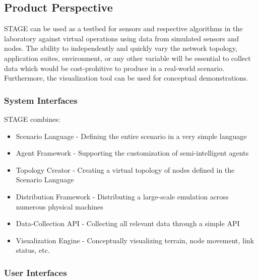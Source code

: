 \documentclass[titlepage]{article}
\begin{document}

\subsection{Product Perspective%
  \label{product-perspective}%
}

STAGE can be used as a testbed for sensors and respective algorithms in the laboratory against virtual operations using data from simulated sensors and nodes. The ability to independently and quickly vary the network topology, application suites, environment, or any other variable will be essential to collect data which would be cost-prohitive to produce in a real-world scenario. Furthermore, the visualization tool can be used for conceptual demonstrations.


\subsubsection{System Interfaces%
  \label{system-interfaces}%
}

STAGE combines:
\begin{itemize}
    \item Scenario Language - Defining the entire scenario in a very simple language
    \item Agent Framework - Supporting the customization of semi-intelligent agents
    \item Topology Creator - Creating a virtual topology of nodes defined in the Scenario Language
    \item Distribution Framework - Distributing a large-scale emulation across numerous physical machines
    \item Data-Collection API - Collecting all relevant data through a simple API
    \item Visualization Engine - Conceptually visualizing terrain, node movement, link status, etc.
\end{itemize}


\subsubsection{User Interfaces%
  \label{user-interfaces}%
}
\end{document}
